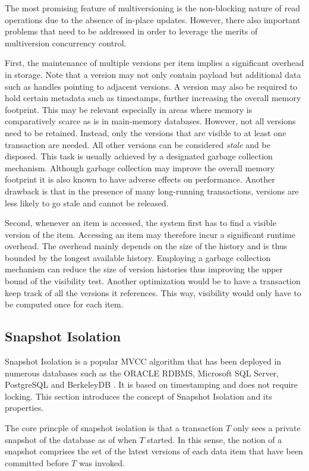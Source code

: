 The most promising feature of multiversioning is the non-blocking nature of read
operations due to the absence of in-place updates. However, there also important
problems that need to be addressed in order to leverage the merits of
multiversion concurrency control.

First, the maintenance of multiple versions per item implies a significant
overhead in storage. Note that a version may not only contain payload but
additional data such as handles pointing to adjacent versions. A version may
also be required to hold certain metadata such as timestamps, further increasing
the overall memory footprint. This may be relevant especially in areas where
memory is comparatively scarce as is in main-memory databases. However, not all
versions need to be retained. Instead, only the versions that are visible to at
least one transaction are needed. All other versions can be considered
\emph{stale} and be disposed. This task is usually achieved by a designated
garbage collection mechanism. Although garbage collection may improve the
overall memory footprint it is also known to have adverse effects on
performance. Another drawback is that in the presence of many long-running
transactions, versions are less likely to go stale and cannot be released.

Second, whenever an item is accessed, the system first has to find a visible
version of the item. Accessing an item may therefore incur a significant runtime
overhead. The overhead mainly depends on the size of the history and is thus
bounded by the longest available history. Employing a garbage collection
mechanism can reduce the size of version histories thus improving the upper
bound of the visibility test. Another optimization would be to have a
transaction keep track of all the versions it references. This way, visibility
would only have to be computed once for each item.

\subsection{Snapshot Isolation}

Snapshot Isolation \cite{berenson1995critique} is a popular MVCC algorithm that
has been deployed in numerous databases such as the ORACLE RDBMS, Microsoft SQL
Server, PostgreSQL and BerkeleyDB \cite{cahill2009serializable}. It is based on
timestamping and does not require locking. This section introduces the concept
of Snapshot Isolation and its properties.

The core princple of snapshot isolation is that a transaction $T$ only sees a
private snapshot of the database as of when $T$ started. In this sense, the
notion of a snapshot comprises the set of the latest versions of each data item
that have been committed before $T$ was invoked.

